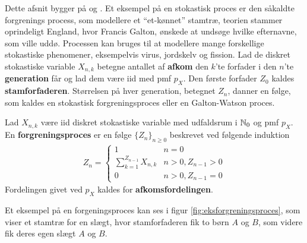 Dette afsnit bygger på \cite{sandsynlighedsBog} og \cite{grimsandsynlighedsBog}.
Et eksempel på en stokastisk proces er den såkaldte forgrenings process, som modellere et ``et-kønnet'' stamtræ, teorien stammer oprindeligt England, hvor Francis Galton, ønskede at undsøge hvilke efternavne, som ville uddø. Processen kan bruges til at modellere mange forskellige stokastiske phenomener, eksempelvis virus, jordskelv og fission.
Lad de diskret stokastiske variable $X_{n,k}$ betegne antallet af \textbf{afkom} den $k$'te forfader i den $n$'te \textbf{generation} får og lad dem være iid med pmf $p_X$. Den første forfader $Z_0$ kaldes \textbf{stamforfaderen}.
Størrelsen på hver generation, betegnet $Z_n$, danner en følge, som kaldes en stokastisk forgreningsproces eller en Galton-Watson proces.
\begin{defn}\label{def:forgreningsproces}
Lad $X_{n,k}$ være iid diskret stokastiske variable med udfaldsrum i $\mathbb{N}_0$ og pmf $p_X$. En \textbf{forgreningsproces} er en følge $\{Z_n\}_{n\geq 0}$ beskrevet ved følgende induktion
\begin{align*}
    Z_n=\begin{cases}
        1&n=0\\
        \sum_{k=1}^{Z_{n-1}}X_{n,k}&n>0,Z_{n-1}>0\\
        0&n>0,Z_{n-1}=0
        \end{cases}
\end{align*}
Fordelingen givet ved $p_X$ kaldes for \textbf{afkomsfordelingen}.
\end{defn}

Et eksempel på en forgeningsproces kan ses i figur \ref{fig:eksforgreningsproces}, som viser et stamtræ for en slægt, hvor stamforfaderen fik to børn $A$ og $B$, som videre fik deres egen slægt $A$ og $B$.

